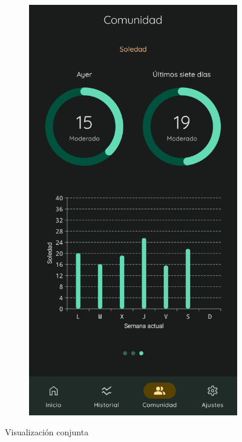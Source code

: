 \begin{figure}[htbp]
\begin{subfigure}[c]{0.4\textwidth}
                \end{subfigure}
                \hspace{0.1\textwidth}
                \begin{subfigure}[c]{0.4\textwidth}
                    \centering
                    \includegraphics[width=1\linewidth]{figures/pruebas/comunidad/Comunidad soledad.png}
                \end{subfigure}
                \caption{Visualización conjunta}
                \label{figure:pruebas:visualizacion_conjunta}
            \end{figure}

